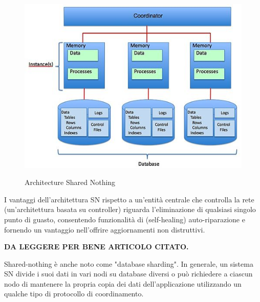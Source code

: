 \begin{figure}[htbp]
\centering
\includegraphics[scale=0.70]{img/Shared_Nothing_Architecture.jpg}\\
\caption{Architecture Shared Nothing \label{figura1.1} \cite{etichetta7}}
\end{figure}

I vantaggi dell'architettura SN rispetto a un'entit\`{a} centrale che controlla la rete (un'architettura basata su controller) riguarda l'eliminazione di qualsiasi singolo punto di guasto, consentendo funzionalit\`{a} di (self-healing) auto-riparazione e fornendo un vantaggio nell'offrire aggiornamenti non distruttivi.\cite{etichetta6} 

\textbf{DA LEGGERE PER BENE ARTICOLO CITATO.}

Shared-nothing \`{e} anche noto come "database sharding". In generale, un sistema SN divide i suoi dati in vari nodi su database diversi o pu\`{o} richiedere a ciascun nodo di mantenere la propria copia dei dati dell'applicazione utilizzando un qualche tipo di protocollo di coordinamento.\cite{etichetta5}\\

